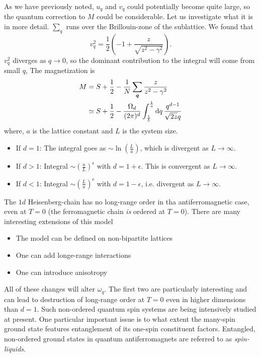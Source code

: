 As we have previously noted, $u_q$ and $v_q$ could potentially become quite large, so the quantum correction to $M$ could be considerable. Let us investigate what it is in more detail.
$\sum_q$ runs over the Brillouin-zone of the sublattice. We found that 
\begin{equation}
	v_q^2 = \frac{1}{2}\left (-1 + \frac{z}{\sqrt{z^2-\gamma^2}}\right ).
\end{equation}
$v_q^2$ diverges as $q\rightarrow0$, so the dominant contribution to the integral will come from small $q$, The magnetization is
\begin{align}
	M &= S +\frac{1}{2} - \frac{1}{N}\sum_{\bm{q}}\frac{z}{z^2-\gamma^2}\nonumber\\
	&\simeq S + \frac{1}{2} -\frac{\Omega_d}{(2\pi)^d}\int_{\frac{1}{L}}^{\frac{1}{a}}\dd{q}\frac{q^{d-1}}{\sqrt{2z}q}
\end{align}
where, $a$ is the lattice constant and $L$ is the system size. 

\begin{itemize}
	\item If $d = 1$: The integral goes as $\sim \ln(\frac{L}{a})$, which is divergent as $L\rightarrow\infty$.
	\item If $d>1$: Integral $\sim\left (\frac{a}{L}\right )^{\epsilon}$ with $d=1 + \epsilon$. This is convergent as $L \rightarrow \infty$.
	\item If $d<1$: Integral $\sim \left (\frac{L}{a}\right )^{\epsilon}$ with $d = 1-\epsilon$, i.e. divergent as $L\rightarrow\infty$.
\end{itemize}
The $1d$ Heisenberg-chain has no long-range order in tha antiferromagnetic case, even at $T= 0$ (the ferromagnetic chain \emph{is} ordered at $T = 0$). There are many interesting extensions of this model
\begin{itemize}
	\item The model can be defined on non-bipartite lattices
	\item One can add longe-range interactions
	\item One can introduce anisotropy
\end{itemize}
All of these changes will alter $\omega_q$. The first two are particularly interesting and can lead to destruction of long-range order at $T = 0$ even in higher dimensions than $d = 1$. 
Such non-ordered quantum spin systems are being intensively studied at present. One particular important issue is to what extent the many-spin ground state features entanglement of its one-spin constituent factors. 
Entangled, non-ordered ground states in quantum antiferromagnets are referred to as \emph{spin-liquids}.